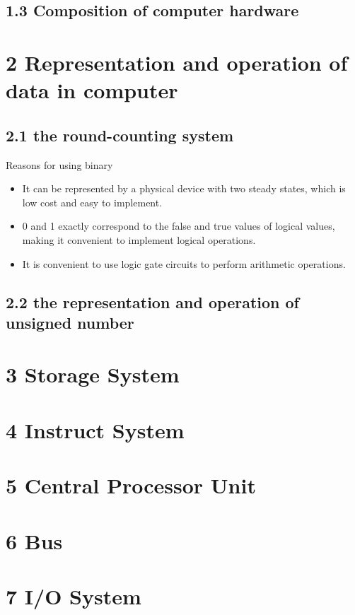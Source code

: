 \subsection*{1.3 Composition of computer hardware}

\newpage

\section*{2 Representation and operation of data in computer}

\subsection*{2.1 the round-counting system}

\begin{flushleft}

	Reasons for using binary
	\begin{itemize}
		\item It can be represented by a physical device with two steady states, which is low cost and easy to implement.
		\item 0 and 1 exactly correspond to the false and true values of logical values, making it convenient to implement logical operations.
		\item It is convenient to use logic gate circuits to perform arithmetic operations.
	\end{itemize}

\end{flushleft}

\subsection*{2.2 the representation and operation of unsigned number}

\newpage

\section*{3 Storage System}

\newpage

\section*{4 Instruct System}  

\newpage

\section*{5 Central Processor Unit}  

\newpage

\section*{6 Bus}  

\newpage

\section*{7 I/O System}  
